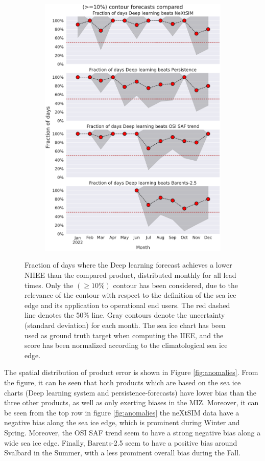 \documentclass[../main/thesis.tex]{subfiles}
\begin{document}
\begin{figure}
\begin{subfigure}{0.32\textwidth}
        \includegraphics[width=\textwidth]{days_beat_weights_09031047.pdf}
    \end{subfigure}
    \caption{\label{fig:days-beat}Fraction of days where the Deep learning forecast achieves a lower NIIEE than the compared product, distributed monthly for all lead times. Only the $(\geq10\%)$ contour has been considered, due to the relevance of the contour with respect to the definition of the sea ice edge and its application to operational end users. The red dashed line denotes the 50\% line. Gray contours denote the uncertainty (standard deviation) for each month. The sea ice chart has been used as ground truth target when computing the IIEE, and the score has been normalized according to the climatological sea ice edge.}
\end{figure}

The spatial distribution of product error is shown in Figure \ref{fig:anomalies}. From the figure, it can be seen that both products which are based on the sea ice charts (Deep learning system and persistence-forecasts) have lower bias than the three other products, as well as only exerting biases in the MIZ. Moreover, it can be seen from the top row in figure \ref{fig:anomalies} the neXtSIM data have a negative bias along the sea ice edge, which is prominent during Winter and Spring. Moreover, the OSI SAF trend seem to have a strong negative bias along a wide sea ice edge. Finally, Barents-2.5 seem to have a positive bias around Svalbard in the Summer, with a less prominent overall bias during the Fall.
\end{document}
